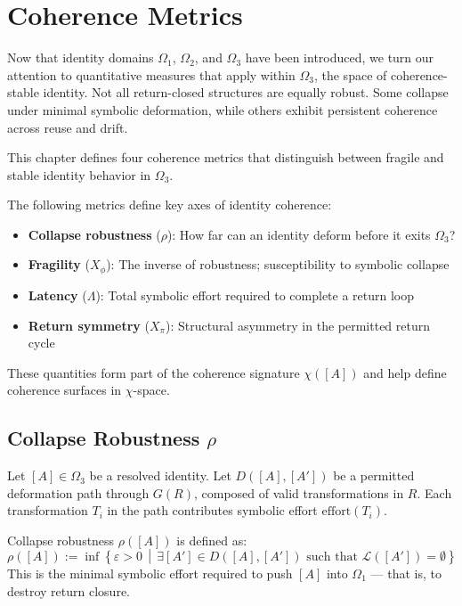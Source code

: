 \chapter{Coherence Metrics}

Now that identity domains $\Omega_1$, $\Omega_2$, and $\Omega_3$ have been introduced,  
we turn our attention to quantitative measures that apply within $\Omega_3$, the space of coherence-stable identity.  
Not all return-closed structures are equally robust.  
Some collapse under minimal symbolic deformation, while others exhibit persistent coherence across reuse and drift.

This chapter defines four coherence metrics that distinguish between fragile and stable identity behavior in $\Omega_3$.

The following metrics define key axes of identity coherence:

\begin{itemize}
  \item \textbf{Collapse robustness} ($\rho$): How far can an identity deform before it exits $\Omega_3$?
  \item \textbf{Fragility} ($X_\phi$): The inverse of robustness; susceptibility to symbolic collapse
  \item \textbf{Latency} ($\Lambda$): Total symbolic effort required to complete a return loop
  \item \textbf{Return symmetry} ($X_\pi$): Structural asymmetry in the permitted return cycle
\end{itemize}

These quantities form part of the coherence signature $\chi([A])$ and help define coherence surfaces in $\chi$-space.

\section{Collapse Robustness $\rho$}

Let $[A] \in \Omega_3$ be a resolved identity.  
Let $D([A], [A'])$ be a permitted deformation path through $G(R)$, composed of valid transformations in $R$.  
Each transformation $T_i$ in the path contributes symbolic effort $\text{effort}(T_i)$.

\begin{definition}
Collapse robustness $\rho([A])$ is defined as:
\begin{equation} \label{eq:collapse-robustness}
\rho([A]) := \inf \left\{ \varepsilon > 0 \,\middle|\, \exists [A'] \in D([A], [A']) \text{ such that } \mathcal{L}([A']) = \emptyset \right\}
\end{equation}
This is the minimal symbolic effort required to push $[A]$ into $\Omega_1$ — that is, to destroy return closure.
\end{definition}

